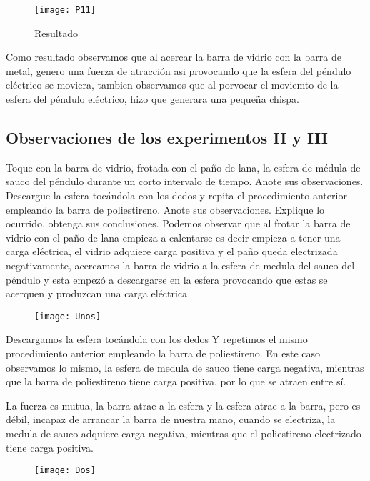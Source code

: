 \documentclass[14pt]{article}
\begin{document}
\begin{figure}[h]
\centering
\texttt{[image: P11]}
\caption{Resultado}
\end{figure}

Como resultado observamos que al acercar la barra de vidrio con la barra de metal, genero una fuerza de atracción asi provocando que la esfera del péndulo eléctrico se moviera, tambien observamos que al porvocar el moviemto de la esfera del péndulo eléctrico, hizo que generara una pequeña chispa.
\subsection{Observaciones de los experimentos II y III}
Toque con la barra de vidrio, frotada con el paño de lana, la esfera de médula de sauco del péndulo durante un corto intervalo de tiempo. Anote sus observaciones. Descargue la esfera tocándola con los dedos y repita el procedimiento anterior empleando la barra de poliestireno. Anote sus observaciones. Explique lo ocurrido, obtenga sus conclusiones.
Podemos observar que al frotar la barra de vidrio con el paño de lana empieza a calentarse es decir empieza a tener una carga eléctrica, el vidrio adquiere carga positiva y el paño queda electrizada negativamente, acercamos la barra de vidrio a la esfera de medula del sauco del péndulo y esta empezó a descargarse en la esfera provocando que estas se acerquen y produzcan una carga eléctrica\\
\begin{figure}
	\begin{center}
		\texttt{[image: Unos]}\\

	\end{center}
\end{figure}

Descargamos la esfera tocándola con los dedos
Y repetimos el mismo procedimiento anterior empleando la barra de poliestireno. 
En este caso observamos lo mismo, la esfera de medula de sauco tiene carga negativa, mientras que la barra de poliestireno tiene carga positiva, por lo que se atraen entre sí.

La fuerza es mutua, la barra atrae a la esfera y la esfera atrae a la barra, pero es débil, incapaz de arrancar la barra de nuestra mano, cuando se electriza, la medula de sauco adquiere carga negativa, mientras que el poliestireno electrizado tiene carga positiva.\\
\begin{figure}
	\begin{center}
		\texttt{[image: Dos]}\\

	\end{center}
\end{figure}
\end{document}
